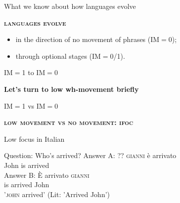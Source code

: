 \documentclass[lesson_slides]{subfiles}
\begin{document}
\begin{frame}[c]{What we know about how languages evolve}

        \noindent \textbf{\textsc{languages evolve}} \pause
        \begin{itemize}
            \item[\ding{227}] in the direction of no movement of phrases (IM$=$0); \pause
            \item[\ding{227}] through optional stages (IM$=$0/1).
        \end{itemize}


\end{frame}
\begin{frame}{IM$=$1 to IM$=$0}

\begin{center}
    \textbf{Let's turn to low wh-movement briefly}
\end{center}
    
\end{frame}
\begin{frame}[c]{IM$=$1 vs IM$=$0}

    \noindent \textbf{\textsc{low movement vs no movement: ifoc}} \pause

    \begin{exe}
    \ex Low focus in Italian \pause
        \begin{xlist}
        \ex Question: Who's arrived?
        \ex \gll Answer A: ?? \textsc{gianni} è arrivato\\
        {} {} {} John is arrived\\ \pause
        \ex \gll Answer B: È arrivato \textsc{gianni}\\
        {} {} is arrived John\\ 
        \glt \hspace{16mm} '\textsc{john} arrived' (Lit: 'Arrived John')
        \end{xlist}
    \end{exe}

\end{frame}
\end{document}
